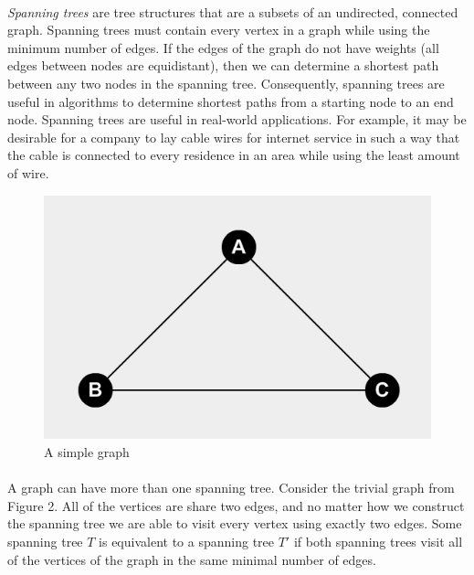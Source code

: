 \documentclass{article}
\begin{document}
\paragraph{}
\textit{Spanning trees} are tree structures that are a subsets of an undirected, connected graph. Spanning trees must contain every vertex in a graph while using the minimum number of edges. If the edges of the graph do not have weights (all edges between nodes are equidistant), then we can determine a shortest path between any two nodes in the spanning tree. Consequently, spanning trees are useful in algorithms to determine shortest paths from a starting node to an end node. Spanning trees are useful in real-world applications. For example, it may be desirable for a company to lay cable wires for internet service in such a way that the cable is connected to every residence in an area while using the least amount of wire.

\begin{figure}[H]
    \centering
    \includegraphics[width=.4\linewidth, height=.2\textheight]{sample_graph}
    \caption{A simple graph}
\end{figure}

\paragraph{}
A graph can have more than one spanning tree. Consider the trivial graph from Figure 2. All of the vertices are share two edges, and no matter how we construct the spanning tree we are able to visit every vertex using exactly two edges. Some spanning tree $T$ is equivalent to a spanning tree $T'$ if both spanning trees visit all of the vertices of the graph in the same minimal number of edges.
\end{document}
